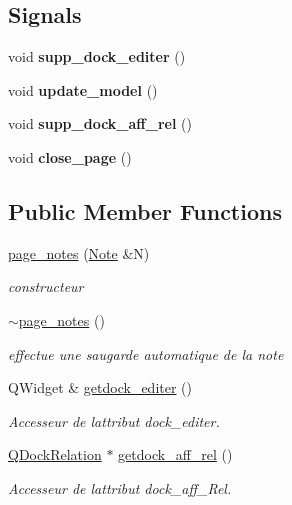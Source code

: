 \subsection*{Signals}
\begin{DoxyCompactItemize}
\item 
\mbox{\label{classpage__notes_a5b8f0db068908857d83afa630b8e4a86}} 
void {\bfseries supp\+\_\+dock\+\_\+editer} ()
\item 
\mbox{\label{classpage__notes_ab0e939533b6d2ceea5c94d7c4739e0cb}} 
void {\bfseries update\+\_\+model} ()
\item 
\mbox{\label{classpage__notes_ac0ee46fc4c828960556fff31762fcffa}} 
void {\bfseries supp\+\_\+dock\+\_\+aff\+\_\+rel} ()
\item 
\mbox{\label{classpage__notes_a53cde94ca69c6d560578b53560e72170}} 
void {\bfseries close\+\_\+page} ()
\end{DoxyCompactItemize}
\subsection*{Public Member Functions}
\begin{DoxyCompactItemize}
\item 
\hyperlink{classpage__notes_ad9a1b3dbe6c7901ed37a5784b1094fa6}{page\+\_\+notes} (\hyperlink{class_note}{Note} \&N)
\begin{DoxyCompactList}\small\item\em constructeur \end{DoxyCompactList}\item 
\hyperlink{classpage__notes_a736d7d7d13818c43a20b20127845c6c0}{$\sim$page\+\_\+notes} ()
\begin{DoxyCompactList}\small\item\em effectue une saugarde automatique de la note \end{DoxyCompactList}\item 
Q\+Widget \& \hyperlink{classpage__notes_ad6002a4d63da2fbfa4a12a591a0d436e}{getdock\+\_\+editer} ()
\begin{DoxyCompactList}\small\item\em Accesseur de l\textquotesingle{}attribut dock\+\_\+editer. \end{DoxyCompactList}\item 
\hyperlink{class_q_dock_relation}{Q\+Dock\+Relation} $\ast$ \hyperlink{classpage__notes_ab1019034677a5e10b14980864abdd21e}{getdock\+\_\+aff\+\_\+rel} ()
\begin{DoxyCompactList}\small\item\em Accesseur de l\textquotesingle{}attribut dock\+\_\+aff\+\_\+\+Rel. \end{DoxyCompactList}\end{DoxyCompactItemize}
